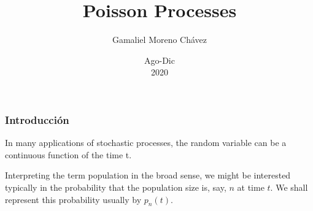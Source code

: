 \documentclass[spanish]{beamer}
\begin{document}
\title{Poisson Processes}
\author{Gamaliel Moreno Chávez}
\date{Ago-Dic\\ 2020}%

\frame{\titlepage}

\begin{frame}
\frametitle{Introducción}
In many applications of stochastic processes, the random variable can be a continuous function of the time t.



Interpreting the term population in the broad sense, we might be
interested typically in the probability that the population size is, say, $n$ at time $t$. We shall represent this probability usually by $p_{n}(t)$.

 
\end{frame}
\end{document}
